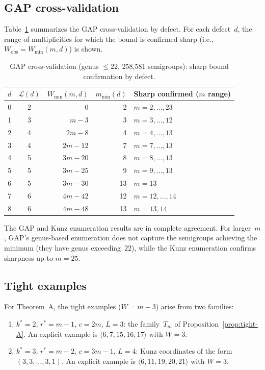 \documentclass[11pt]{amsart}
\theoremstyle{definition}
\theoremstyle{remark}
\begin{document}
\subsection{GAP cross-validation}

Table~\ref{tab:gap-sharp} summarizes the GAP cross-validation by defect.
For each defect~$d$, the range of multiplicities for which the bound is
confirmed sharp (i.e., $W_{\mathrm{obs}} = W_{\min}(m,d)$) is shown.

\begin{table}[ht]
\centering
\caption{GAP cross-validation (genus $\le 22$, 258{,}581 semigroups):
sharp bound confirmation by defect.}\label{tab:gap-sharp}
\begin{tabular}{rcrrl}
\toprule
$d$ & $\mathcal{L}(d)$ & $W_{\min}(m,d)$ & $m_{\min}(d)$ & Sharp confirmed ($m$ range) \\
\midrule
0 & 2 & $0$ & 2 & $m = 2, \ldots, 23$ \\
1 & 3 & $m - 3$ & 3 & $m = 3, \ldots, 12$ \\
2 & 4 & $2m - 8$ & 4 & $m = 4, \ldots, 13$ \\
3 & 4 & $2m - 12$ & 7 & $m = 7, \ldots, 13$ \\
4 & 5 & $3m - 20$ & 8 & $m = 8, \ldots, 13$ \\
5 & 5 & $3m - 25$ & 9 & $m = 9, \ldots, 13$ \\
6 & 5 & $3m - 30$ & 13 & $m = 13$ \\
7 & 6 & $4m - 42$ & 12 & $m = 12, \ldots, 14$ \\
8 & 6 & $4m - 48$ & 13 & $m = 13, 14$ \\
\bottomrule
\end{tabular}
\end{table}

The GAP and Kunz enumeration results are in complete agreement.
For larger~$m$, GAP's genus-based enumeration does not capture
the semigroups achieving the minimum (they have genus exceeding~$22$),
while the Kunz enumeration confirms sharpness up to $m = 25$.

\subsection{Tight examples}

For Theorem~A, the tight examples ($W = m - 3$) arise from two families:
\begin{enumerate}[nosep]
  \item $k^* = 2$, $r^* = m - 1$, $c = 2m$, $L = 3$: the family~$T_m$ of
    Proposition~\ref{prop:tight-A}.  An explicit example is
    $\langle 6, 7, 15, 16, 17 \rangle$ with $W = 3$.
  \item $k^* = 3$, $r^* = m - 2$, $c = 3m - 1$, $L = 4$: Kunz coordinates
    of the form $(3, 3, \ldots, 3, 1)$.  An explicit example is
    $\langle 6, 11, 19, 20, 21 \rangle$ with $W = 3$.
\end{enumerate}
\end{document}
